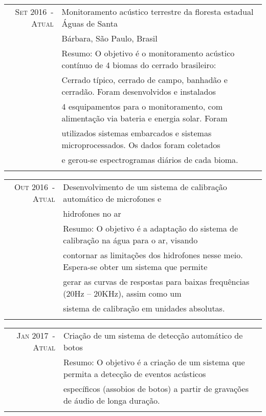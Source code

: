 \documentclass[a4paper,10pt]{article}
\begin{document}
\begin{tabular}{rl}

    \textsc{Set 2016~-~Atual}   & Monitoramento acústico terrestre da floresta estadual Águas de Santa \\
                                & Bárbara, São Paulo,  Brasil \\
                                &\footnotesize{Resumo: O objetivo é o monitoramento acústico contínuo de 4 biomas do cerrado brasileiro:}\\ 
                                &\footnotesize{Cerrado típico, cerrado de campo, banhadão e cerradão. Foram desenvolvidos e instalados}\\ 
                                &\footnotesize{4 esquipamentos para o monitoramento, com alimentação via bateria e energia solar. Foram}\\
                                &\footnotesize{utilizados sistemas embarcados e sistemas microprocessados. Os dados foram coletados}\\ 
                                &\footnotesize{e gerou-se espectrogramas diários de cada bioma.}\\
                                &\\
\end{tabular}
\begin{tabular}{rl}


    \textsc{Out 2016~-~Atual}   & Desenvolvimento de um sistema de calibração automático de microfones e \\
                                & hidrofones no ar\\ 
                                &\footnotesize{Resumo: O objetivo é a adaptação do sistema de calibração na água para o ar, visando}\\ 
                                &\footnotesize{contornar as limitações dos hidrofones nesse meio. Espera-se obter um sistema que permite}\\ 
                                &\footnotesize{gerar as curvas de respostas para baixas frequências (20Hz – 20KHz), assim como um}\\ 
                                &\footnotesize{sistema de calibração em unidades absolutas.}\\
                                &\\
\end{tabular}
\begin{tabular}{rl}


    \textsc{Jan 2017~-~Atual}   & Criação de um sistema de detecção automático de botos\\
                                &\footnotesize{Resumo: O objetivo é a criação de um sistema que permita a detecção de eventos acústicos} \\ 
                                &\footnotesize{específicos (assobios de botos) a partir de gravações de áudio de longa duração.} \\
                                &\\
\end{tabular}
\end{document}
